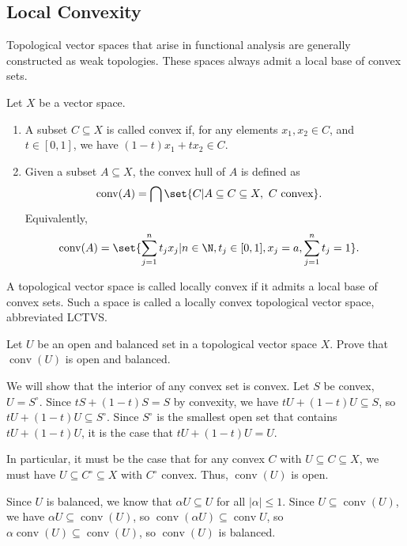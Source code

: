 \documentclass[10pt]{mypackage}
\DeclareMathOperator{\conv}{conv}
\begin{document}
\subsection{Local Convexity}%
Topological vector spaces that arise in functional analysis are generally constructed as weak topologies. These spaces always admit a local base of convex sets.
\begin{definition}
  Let $X$ be a vector space.
  \begin{enumerate}[(1)]
    \item A subset $C\subseteq X$ is called convex if, for any elements $x_1,x_2\in C$, and $t\in [0,1]$, we have $\left(1-t\right)x_1 + tx_2\in C$.
    \item Given a subset $A\subseteq X$, the convex hull of $A$ is defined as
      \begin{align*}
        \conv(A) &= \bigcap\set{C| A\subseteq C\subseteq X,~C\text{ convex}}.
      \end{align*}
      Equivalently,
      \begin{align*}
        \conv(A) &= \set{\sum_{j=1}^{n}t_jx_j| n\in\N,t_j\in [0,1],x_j=a,\sum_{j=1}^{n}t_j = 1}.
      \end{align*}
  \end{enumerate}
\end{definition}
\begin{definition}
  A topological vector space is called locally convex if it admits a local base of convex sets. Such a space is called a locally convex topological vector space, abbreviated LCTVS.
\end{definition}
\begin{exercise}
  Let $U$ be an open and balanced set in a topological vector space $X$. Prove that $\conv(U)$ is open and balanced.
\end{exercise}
\begin{solution}
  We will show that the interior of any convex set is convex. Let $S$ be convex, $U = S^{\circ}$. Since $tS + \left(1-t\right)S = S$ by convexity, we have $tU + \left(1-t\right)U \subseteq S$, so $tU + \left(1-t\right)U \subseteq S^{\circ}$. Since $S^{\circ}$ is the smallest open set that contains $tU + \left(1-t\right)U$, it is the case that $tU + \left(1-t\right)U = U$.\newline

  In particular, it must be the case that for any convex $C$ with $U\subseteq C\subseteq X$, we must have $U\subseteq C^{\circ}\subseteq X$ with $C^{\circ}$ convex. Thus, $\conv(U)$ is open.\newline

  Since $U$ is balanced, we know that $\alpha U\subseteq U$ for all $\left\vert \alpha \right\vert \leq 1$. Since $U\subseteq \conv(U)$, we have $\alpha U \subseteq \conv(U)$, so $\conv(\alpha U) \subseteq \conv U$, so $\alpha \conv(U) \subseteq \conv(U)$, so $\conv(U)$ is balanced.
\end{solution}
\end{document}
